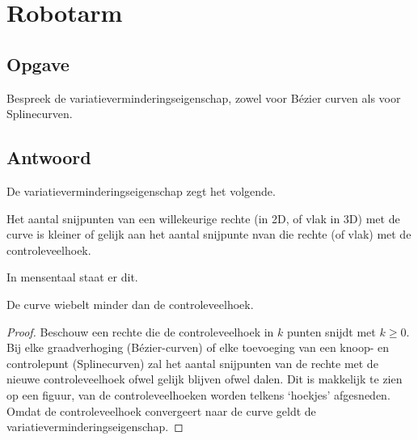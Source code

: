 \documentclass[examenvragen.tex]{subfiles}
\begin{document}
\section{Robotarm}
\subsection{Opgave}
Bespreek de variatieverminderingseigenschap, zowel voor B\'ezier curven als voor Splinecurven.

\subsection{Antwoord}
De variatieverminderingseigenschap zegt het volgende.
\begin{center}
Het aantal snijpunten van een willekeurige rechte (in 2D, of vlak in 3D) met de curve is kleiner of gelijk aan het aantal snijpunte nvan die rechte (of vlak) met de controleveelhoek. 
\end{center}
In mensentaal staat er dit.
\begin{center}
De curve wiebelt minder dan de controleveelhoek.
\end{center}
\begin{proof}
Beschouw een rechte die de controleveelhoek in $k$ punten snijdt met $k\ge 0$. Bij elke graadverhoging (B\'ezier-curven) of elke toevoeging van een knoop- en controlepunt (Splinecurven) zal het aantal snijpunten van de rechte met de nieuwe controleveelhoek ofwel gelijk blijven ofwel dalen. Dit is makkelijk te zien op een figuur, van de controleveelhoeken worden telkens `hoekjes' afgesneden. Omdat de controleveelhoek convergeert naar de curve geldt de variatieverminderingseigenschap.
\end{proof}
\end{document}
